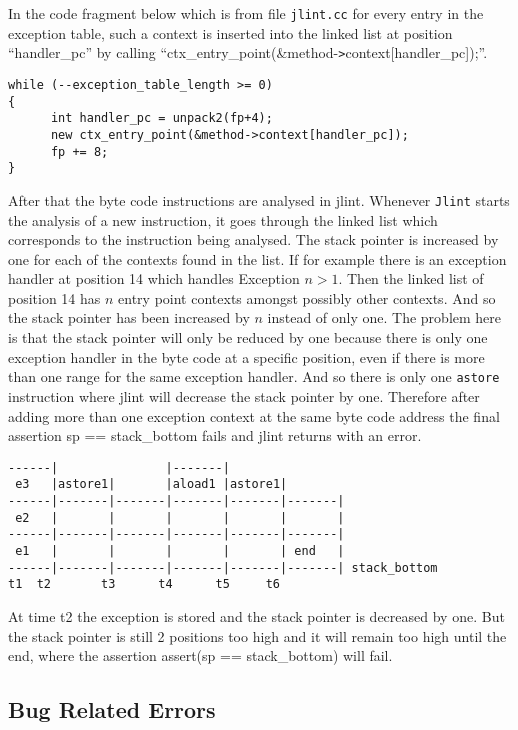 \documentclass[11pt,twoside,a4paper,draft]{article}
\begin{document}
In the code fragment below which is from file \texttt{jlint.cc} for 
every entry in the exception table, such a context is inserted into the linked
list at position ``handler\_pc'' by calling 
``ctx\_entry\_point(\&method-\verb+>+context[handler\_pc]);''.
\begin{verbatim}
while (--exception_table_length >= 0)
{ 
      int handler_pc = unpack2(fp+4);
      new ctx_entry_point(&method->context[handler_pc]); 
      fp += 8;
}
\end{verbatim}
After that the byte code instructions are analysed in jlint. Whenever 
\texttt{Jlint} starts the analysis of a new instruction, it goes through the
linked list which corresponds to the instruction being analysed. The 
stack pointer is increased by one for each of the contexts found in the list.
If for example there is an exception handler at position 14 which handles
Exception $n > 1$. Then the linked list of position 14 has $n$ entry point
contexts amongst possibly other contexts. And so the stack pointer has been
increased by $n$ instead of only one. The problem here is that the stack 
pointer will only be reduced by one because there is only one exception 
handler in the byte code at a specific position, even if there is more than 
one range for the same exception handler. And so there is only one 
\texttt{astore} instruction
where jlint will decrease the stack pointer by one. Therefore after adding more
than one exception context at the same byte code address the final assertion
sp == stack\_bottom fails and jlint returns with an error.

\begin{verbatim}
------|               |-------|
 e3   |astore1|       |aload1 |astore1|
------|-------|-------|-------|-------|-------|
 e2   |       |       |       |       |       |
------|-------|-------|-------|-------|-------|
 e1   |       |       |       |       | end   |
------|-------|-------|-------|-------|-------| stack_bottom
t1	t2       t3      t4      t5     t6
\end{verbatim}


At time t2 the exception is stored and the stack pointer is decreased by one.
But the stack pointer is still 2 positions too high and it will remain too high
until the end, where the assertion assert(sp == stack\_bottom) will fail.

\subsection {Bug Related Errors}
\end{document}
